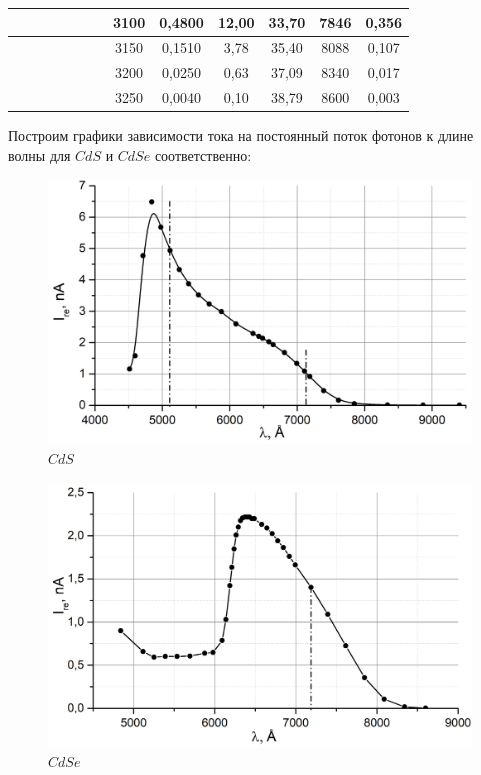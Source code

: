 \documentclass[a4paper, 12pt]{article}
\begin{document}
\begin{table}[!htb]
{\begin{tabular}{|c|c|c|c|c|c|c|c|c|c|c|c|c|}
       &       &       &       &      &       &  & 3100   & 0,4800 & 12,00 & 33,70 & 7846 & 0,356 \\ \hline
       &       &       &       &      &       &  & 3150   & 0,1510 & 3,78  & 35,40 & 8088 & 0,107 \\ \hline
       &       &       &       &      &       &  & 3200   & 0,0250 & 0,63  & 37,09 & 8340 & 0,017 \\ \hline
       &       &       &       &      &       &  & 3250   & 0,0040 & 0,10  & 38,79 & 8600 & 0,003 \\ \hline
\end{tabular}
}
\end{table}

\newpage
Построим графики зависимости тока на постоянный поток фотонов к длине волны для $CdS$ и $CdSe$ соответственно:

\begin{figure}[!htb]
\centering
\includegraphics[width=.8\linewidth]{CdS.png}
\vspace{-0.3cm}
\caption{$CdS$}
\end{figure}




\begin{figure}[!htb]
\centering
\includegraphics[width=.8\linewidth]{CdSe.png}
\vspace{-0.3cm}
\caption{$CdSe$}
\end{figure}
\end{document}
